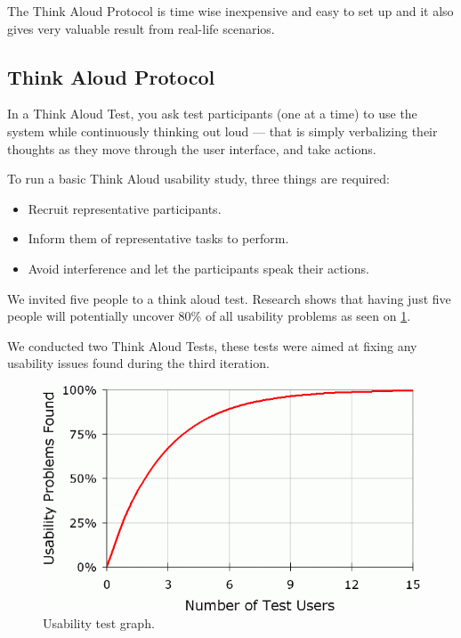 The Think Aloud Protocol is time wise inexpensive and easy to set up and it also gives very valuable result from real-life scenarios.

\subsection{Think Aloud Protocol}
In a Think Aloud Test, you ask test participants (one at a time) to use the system while continuously thinking out loud --- that is  simply verbalizing their thoughts as they move through the user interface, and take actions.

To run a basic Think Aloud usability study, three things are required:

\begin{itemize}
\item Recruit representative participants.
\item Inform them of representative tasks to perform.
\item Avoid interference and let the participants speak their actions.
\end{itemize}

We invited five people to a think aloud test. Research shows that having just five people will potentially uncover 80\% of all usability problems \cite{jakobnielsen2000fiveusers} as seen on \ref{fig:usabilitycurve}.

We conducted two Think Aloud Tests, these tests were aimed at fixing any usability issues found during the third iteration.

\begin{figure}[ht]
\centering
\includegraphics[width=\columnwidth]{usabilitycurve.png}
\caption{Usability test graph.}
\label{fig:usabilitycurve}
\end{figure}

